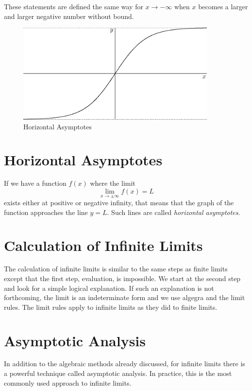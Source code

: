 \documentclass[fleqn]{report}
\begin{document}
These statements are defined the same way for $x \rightarrow
-\infty$ when $x$ becomes a larger and larger negative number
without bound.

\begin{figure}[ht]
\centering
\includegraphics[width=10cm]{figure20.eps}
\caption{Horizontal Asymptotes}
\label{Horizontal Asymptotes}
\end{figure}

\section*{Horizontal Asymptotes}

If we have a function $f(x)$ where the limit 
\begin{equation*}
\lim_{x \rightarrow \pm \infty} f(x) = L
\end{equation*}
exists either at positive or negative infinity, that means
that the graph of the function approaches the line $y=L$.
Such lines are called \emph{horizontal asymptotes}.

\section*{Calculation of Infinite Limits}

The calculation of infinite limits is similar to the same
steps as finite limits except that the first step, evaluation,
is impossible. We start at the second step and look for a
simple logical explanation. If such an explanation is not
forthcoming, the limit is an indeterminate form and we use
algegra and the limit rules. The limit rules apply to infinite
limits as they did to finite limits.

\section*{Asymptotic Analysis}

In addition to the algebraic methods already discussed, for
infinite limits there is a powerful technique called
asymptotic analysis. In practice, this is the most commonly
used approach to infinite limits.
\end{document}
